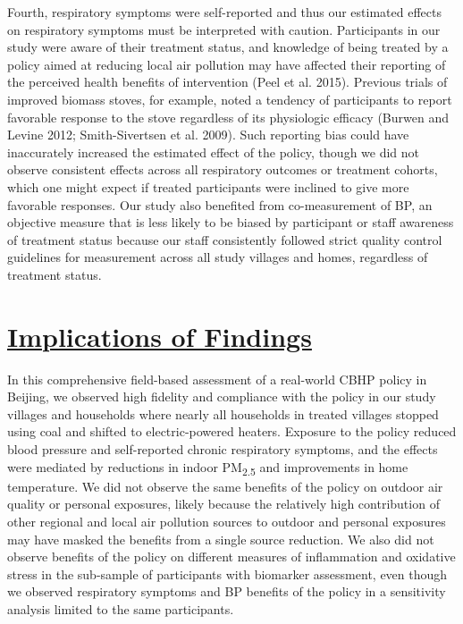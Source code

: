 \documentclass[
  letterpaper,
  DIV=11,
  numbers=noendperiod]{scrartcl}
\providecommand{\DIFadd}[1]{{\protect\color{blue}\underline{#1}}} %
\providecommand{\DIFaddbegin}{} %
\providecommand{\DIFaddend}{} %
\providecommand{\DIFdelbegin}{} %
\providecommand{\DIFdelend}{} %
\newcommand{\DIFscaledelfig}{0.5}
\newlength{\DIFdelgraphicswidth} %
\newlength{\DIFdelgraphicsheight} %
\newcommand{\DIFaddincludegraphics}[2][]{{\color{blue}\fbox{\DIFOincludegraphics[#1]{#2}}}} %
\newcommand{\DIFdelincludegraphics}[2][]{%
\sbox{\DIFdelgraphicsbox}{\DIFOincludegraphics[#1]{#2}}%
\settoboxwidth{\DIFdelgraphicswidth}{\DIFdelgraphicsbox} %
\settoboxtotalheight{\DIFdelgraphicsheight}{\DIFdelgraphicsbox} %
\scalebox{\DIFscaledelfig}{%
\parbox[b]{\DIFdelgraphicswidth}{\usebox{\DIFdelgraphicsbox}\\[-\baselineskip] \rule{\DIFdelgraphicswidth}{0em}}\llap{\resizebox{\DIFdelgraphicswidth}{\DIFdelgraphicsheight}{%
\setlength{\unitlength}{\DIFdelgraphicswidth}%
\begin{picture}(1,1)%
\thicklines\linethickness{2pt} %
{\color[rgb]{1,0,0}\put(0,0){\framebox(1,1){}}}%
{\color[rgb]{1,0,0}\put(0,0){\line( 1,1){1}}}%
{\color[rgb]{1,0,0}\put(0,1){\line(1,-1){1}}}%
\end{picture}%
}\hspace*{3pt}}} %
} %
\DeclareRobustCommand{\DIFaddbegin}{\DIFOaddbegin \let\includegraphics\DIFaddincludegraphics} %
\DeclareRobustCommand{\DIFaddend}{\DIFOaddend \let\includegraphics\DIFOincludegraphics} %
\DeclareRobustCommand{\DIFdelbegin}{\DIFOdelbegin \let\includegraphics\DIFdelincludegraphics} %
\DeclareRobustCommand{\DIFdelend}{\DIFOaddend \let\includegraphics\DIFOincludegraphics} %
\begin{document}
Fourth, respiratory symptoms were self-reported and thus our estimated
effects on respiratory symptoms must be interpreted with caution.
Participants in our study were aware of their treatment status, and
knowledge of being treated by a policy aimed at reducing local air
pollution may have affected their reporting of the perceived health
benefits of intervention (Peel et al. 2015). Previous trials of improved
biomass stoves, for example, noted a tendency of participants to report
favorable response to the stove regardless of its physiologic efficacy
(Burwen and Levine 2012; Smith-Sivertsen et al. 2009). Such reporting
bias could have inaccurately increased the estimated effect of the
policy, though we did not observe consistent effects across all
respiratory outcomes or treatment cohorts, which one might expect if
treated participants were inclined to give more favorable responses. Our
study also benefited from co-measurement of BP, an objective measure
that is less likely to be biased by participant or staff awareness of
treatment status because our staff consistently followed strict quality
control guidelines for measurement across all study villages and homes,
regardless of treatment status.

\DIFdelbegin %
\DIFdelend \DIFaddbegin \section{\DIFadd{Implications of Findings}}\label{implications-of-findings}
\DIFaddend 

In this comprehensive field-based assessment of a real-world CBHP policy
in Beijing, we observed high fidelity and compliance with the policy in
our study villages and households where nearly all households in treated
villages stopped using coal and shifted to electric-powered heaters.
Exposure to the policy reduced blood pressure and self-reported chronic
respiratory symptoms, and the effects were mediated by reductions in
indoor PM\textsubscript{2.5} and improvements in home temperature. We
did not observe the same benefits of the policy on outdoor air quality
or personal exposures, likely because the relatively high contribution
of other regional and local air pollution sources to outdoor and
personal exposures may have masked the benefits from a single source
reduction. We also did not observe benefits of the policy on different
measures of inflammation and oxidative stress in the sub-sample of
participants with biomarker assessment, even though we observed
respiratory symptoms and BP benefits of the policy in a sensitivity
analysis limited to the same participants.
\end{document}
